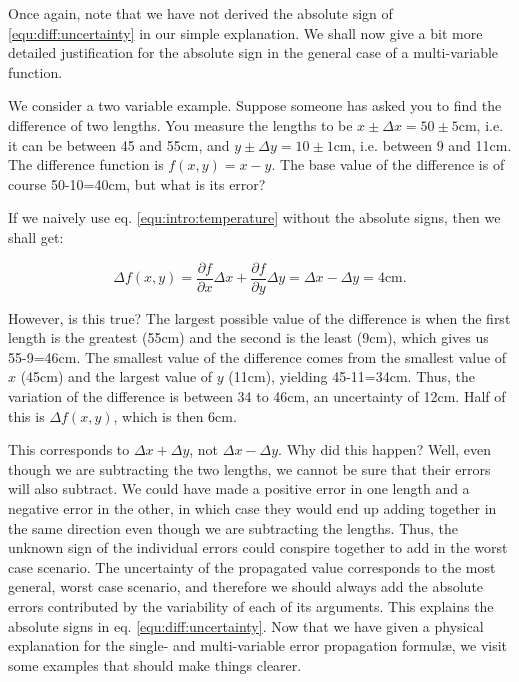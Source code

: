 Once again, note that we have not derived the absolute sign of \ref{equ:diff:uncertainty} in our
simple explanation. We shall now give a bit more detailed justification
for the absolute sign in the general case of a multi-variable function.

We consider a two variable example. Suppose someone has asked you
to find the difference of two lengths. You measure the lengths to
be $x\pm\Delta x=50\pm5$cm, i.e. it can be between 45 and 55cm, and
$y\pm\Delta y=10\pm1$cm, i.e. between 9 and 11cm. The difference
function is $f(x,y)=x-y$. The base value of the difference is of
course 50-10=40cm, but what is its error?

If we naively use eq. \ref{equ:intro:temperature} without the absolute signs, then we shall
get:

\begin{equation}
\Delta f(x,y)=\frac{\partial f}{\partial x}\Delta x+\frac{\partial f}{\partial y}\Delta y=\Delta x-\Delta y=4\textrm{cm}.
\end{equation}


However, is this true? The largest possible value of the difference
is when the first length is the greatest (55cm) and the second is
the least (9cm), which gives us 55-9=46cm. The smallest value of the
difference comes from the smallest value of $x$ (45cm) and the largest
value of $y$ (11cm), yielding 45-11=34cm. Thus, the variation of
the difference is between 34 to 46cm, an uncertainty of 12cm. Half
of this is $\Delta f(x,y)$, which is then 6cm.

This corresponds to $\Delta x+\Delta y$, not $\Delta x-\Delta y$.
Why did this happen? Well, even though we are subtracting the two
lengths, we cannot be sure that their errors will also subtract. We
could have made a positive error in one length and a negative error
in the other, in which case they would end up adding together in the
same direction even though we are subtracting the lengths. Thus, the
unknown sign of the individual errors could conspire together to add
in the worst case scenario. The uncertainty of the propagated value
corresponds to the most general, worst case scenario, and therefore
we should always add the absolute errors contributed by the variability
of each of its arguments. This explains the absolute signs in eq. \ref{equ:diff:uncertainty}.
Now that we have given a physical explanation for the single- and multi-variable error propagation formul\ae, we visit some examples that should make things clearer.
\vspace*{.5cm}  \\

